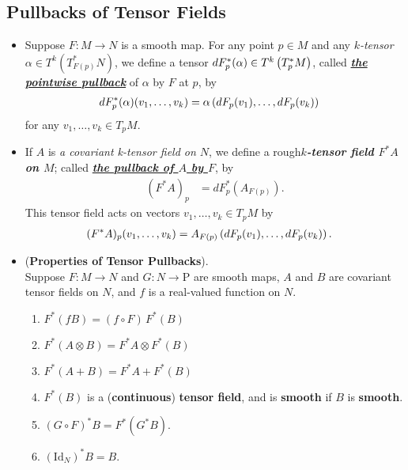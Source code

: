\documentclass[11pt]{article}
\begin{document}
\subsection{Pullbacks of Tensor Fields}
\begin{itemize}
\item \begin{definition}
Suppose $F: M \rightarrow N$ is a smooth map. For any point $p \in M$ and any \emph{$k$-tensor} $\alpha \in T^k(T^{*}_{F(p)}N)$, we define a tensor $dF_p^{*}(\alpha) \in T^k\left(T^{*}_{p}M\right)$, called \underline{\emph{\textbf{the pointwise pullback}}} of $\alpha$ by $F$ at $p$, by
\begin{align*}
dF_p^{*}(\alpha)(v_1, \ldots, v_k) &= \alpha\left(dF_p(v_1), \ldots, dF_p(v_k)\right)
\end{align*} for any $v_1,\ldots,v_k \in T_pM$. 
\end{definition}

\item \begin{definition}
If $A$ is \emph{a covariant k-tensor field on $N$}, we define a rough\textbf{\emph{$k$-tensor field $F^{*}A$ on $M$}}; called  \underline{\emph{\textbf{the pullback of $A$ by $F$}}}, by
\begin{align*}
(F^{*}A)_{p} &= dF_p^{*}(A_{F(p)}).
\end{align*}
This tensor field acts on vectors $v_1,\ldots,v_k \in T_pM$ by
\begin{align*}
(F^{*}A)_{p}(v_1, \ldots, v_k) &= A_{F(p)}\left(dF_p(v_1), \ldots, dF_p(v_k)\right).
\end{align*}
\end{definition}

\item \begin{proposition} (\textbf{Properties of Tensor Pullbacks}). \\
Suppose $F: M \rightarrow N$ and $G: N \rightarrow $P are smooth maps, $A$ and $B$ are covariant tensor fields on $N$, and $f$ is a real-valued function on $N$.
\begin{enumerate}
\item $F^{*}(fB) = (f \circ F)\,F^{*}(B)$
\item $F^{*}(A \otimes B) = F^{*}A \otimes F^{*}(B)$
\item $F^{*}(A + B) = F^{*}A + F^{*}(B)$
\item $F^{*}(B)$ is a (\textbf{continuous}) \textbf{tensor field}, and is \textbf{smooth} if $B$ is \textbf{smooth}.
\item $(G \circ F)^{*}B = F^{*}(G^{*}B).$
\item $(\text{Id}_N)^{*}B = B.$
\end{enumerate}
\end{proposition}


\end{itemize}
\end{document}
